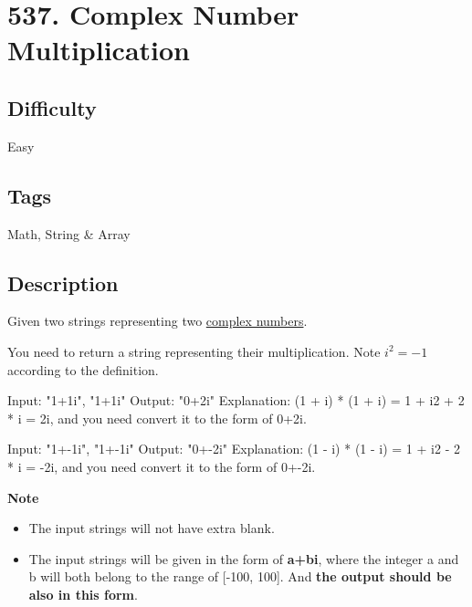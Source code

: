 \tocless\section{537. Complex Number Multiplication}
\label{algo:537}

\subsection*{Difficulty}
Easy

\subsection*{Tags}
Math, String \& Array

\subsection*{Description}
Given two strings representing two \href{https://en.wikipedia.org/wiki/Complex_number}{complex numbers}.

You need to return a string representing their multiplication. Note $i^2 = -1$ according to the definition.

\begin{example}
\begin{multilinecode}
Input: "1+1i", "1+1i"
Output: "0+2i"
Explanation: (1 + i) * (1 + i) = 1 + i2 + 2 * i = 2i, and you need convert it to the form of 0+2i.
\end{multilinecode}
\end{example}

\begin{example}
\begin{multilinecode}
Input: "1+-1i", "1+-1i"
Output: "0+-2i"
Explanation: (1 - i) * (1 - i) = 1 + i2 - 2 * i = -2i, and you need convert it to the form of 0+-2i.
\end{multilinecode}
\end{example}

\textbf{Note}
\begin{itemize}
    \item The input strings will not have extra blank.
    \item The input strings will be given in the form of \textbf{a+bi}, where the integer a and b will both belong to the range of [-100, 100]. And \textbf{the output should be also in this form}.
\end{itemize}

